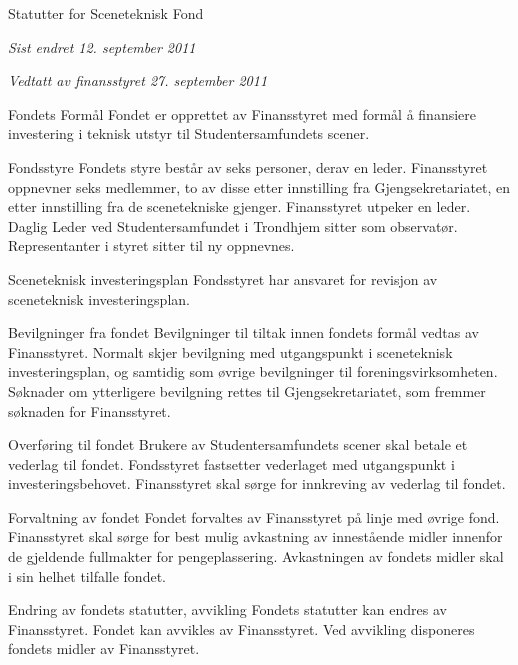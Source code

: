 \begin{fond}{Statutter for Sceneteknisk Fond}

\emph{Sist endret 12. september 2011}

\emph{Vedtatt av finansstyret 27. september 2011 }


\begin{fondsparagraf}{Fondets Formål}
Fondet er opprettet av Finansstyret med formål å finansiere investering i teknisk
utstyr til Studentersamfundets scener.
\end{fondsparagraf}
\begin{fondsparagraf}{Fondsstyre}
Fondets styre består av seks personer, derav en leder. Finansstyret oppnevner seks medlemmer, to av disse etter innstilling fra Gjengsekretariatet, en etter innstilling fra de scenetekniske gjenger. Finansstyret utpeker en leder. Daglig Leder ved Studentersamfundet i Trondhjem sitter som observatør. Representanter i styret sitter til ny oppnevnes.
\end{fondsparagraf}
\begin{fondsparagraf}{Sceneteknisk investeringsplan}
Fondsstyret har ansvaret for revisjon av sceneteknisk investeringsplan.
\end{fondsparagraf}
\begin{fondsparagraf}{Bevilgninger fra fondet}
Bevilgninger til tiltak innen fondets formål vedtas av Finansstyret. Normalt
skjer bevilgning med utgangspunkt i sceneteknisk investeringsplan, og samtidig som øvrige bevilgninger til
foreningsvirksomheten. Søknader om ytterligere bevilgning rettes til Gjengsekretariatet, som fremmer søknaden for
Finansstyret.
\end{fondsparagraf}
\begin{fondsparagraf}{Overføring til fondet}
Brukere av Studentersamfundets scener skal betale et vederlag til fondet.
Fondsstyret fastsetter vederlaget med utgangspunkt i investeringsbehovet. Finansstyret skal sørge for innkreving av
vederlag til fondet.
\end{fondsparagraf}
\begin{fondsparagraf}{Forvaltning av fondet}
Fondet forvaltes av Finansstyret på linje med øvrige fond. Finansstyret skal
sørge for best mulig avkastning av innestående midler innenfor de gjeldende fullmakter for pengeplassering.
Avkastningen av fondets midler skal i sin helhet tilfalle fondet.
\end{fondsparagraf}
\begin{fondsparagraf}{Endring av fondets statutter, avvikling}
Fondets statutter kan endres av Finansstyret. Fondet kan avvikles av
Finansstyret. Ved avvikling disponeres fondets midler av Finansstyret.
\end{fondsparagraf}

\end{fond}


